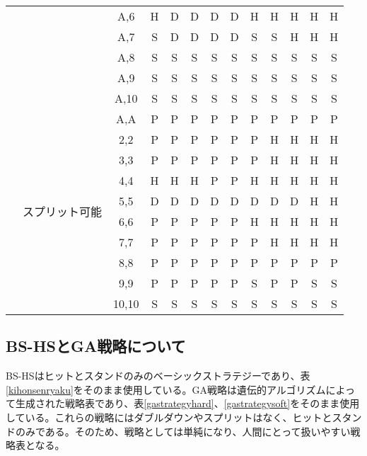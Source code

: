 \begin{table}[H]
\begin{center}
\begin{tabular}{|c|c|c|c|c|c|c|c|c|c|c|c|c|}
                            &                           & A,6   & H & D & D & D & D & H & H & H & H  & H \\ \cline{3-13} 
                            &                           & A,7   & S & D & D & D & D & S & S & H & H  & H \\ \cline{3-13} 
                            &                           & A,8   & S & S & S & S & S & S & S & S & S  & S \\ \cline{3-13} 
                            &                           & A,9   & S & S & S & S & S & S & S & S & S  & S \\ \cline{3-13} 
                            &                           & A,10  & S & S & S & S & S & S & S & S & S  & S \\ \cline{2-13} 
                            & \multirow{10}{*}{スプリット可能} & A,A   & P & P & P & P & P & P & P & P & P  & P \\ \cline{3-13} 
                            &                           & 2,2   & P & P & P & P & P & P & H & H & H  & H \\ \cline{3-13} 
                            &                           & 3,3   & P & P & P & P & P & P & H & H & H  & H \\ \cline{3-13} 
                            &                           & 4,4   & H & H & H & P & P & H & H & H & H  & H \\ \cline{3-13} 
                            &                           & 5,5   & D & D & D & D & D & D & D & D & H  & H \\ \cline{3-13} 
                            &                           & 6,6   & P & P & P & P & P & H & H & H & H  & H \\ \cline{3-13} 
                            &                           & 7,7   & P & P & P & P & P & P & H & H & H  & H \\ \cline{3-13} 
                            &                           & 8,8   & P & P & P & P & P & P & P & P & P  & P \\ \cline{3-13} 
                            &                           & 9,9   & P & P & P & P & P & S & P & P & S  & S \\ \cline{3-13} 
                            &                           & 10,10 & S & S & S & S & S & S & S & S & S  & S \\ \hline
    \end{tabular}
    \end{center}
\end{table}




\subsection{BS-HSとGA戦略について}

BS-HSはヒットとスタンドのみのベーシックストラテジーであり、表\ref{kihonsenryaku}をそのまま使用している。GA戦略は遺伝的アルゴリズムによって生成された戦略表であり、表\ref{gastrategyhard}、\ref{gastrategysoft}をそのまま使用している。これらの戦略にはダブルダウンやスプリットはなく、ヒットとスタンドのみである。そのため、戦略としては単純になり、人間にとって扱いやすい戦略表となる。

